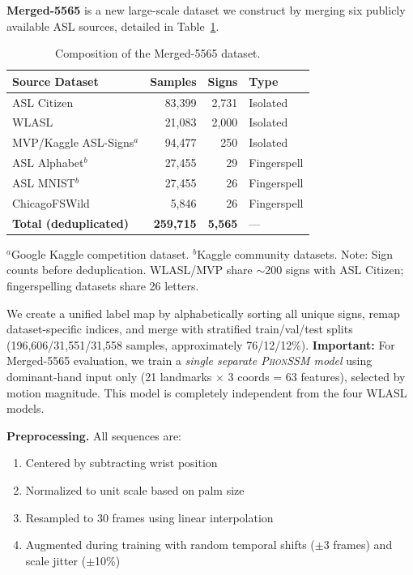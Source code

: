 \documentclass{article}
\newcommand{\phonssm}{\textsc{PhonSSM}}
\begin{document}
\textbf{Merged-5565} is a new large-scale dataset we construct by merging six publicly available ASL sources, detailed in Table~\ref{tab:merged_sources}.

\begin{table}[ht]
\caption{Composition of the Merged-5565 dataset.}
\label{tab:merged_sources}
\vspace{-1mm}
\begin{center}
\begin{small}
\begin{tabular}{lrrl}
\toprule
Source Dataset & Samples & Signs & Type \\
\midrule
ASL Citizen \citep{desai2023asl} & 83,399 & 2,731 & Isolated \\
WLASL \citep{li2020word} & 21,083 & 2,000 & Isolated \\
MVP/Kaggle ASL-Signs$^a$ & 94,477 & 250 & Isolated \\
\addlinespace
ASL Alphabet$^b$ & 27,455 & 29 & Fingerspell \\
ASL MNIST$^b$ & 27,455 & 26 & Fingerspell \\
ChicagoFSWild \citep{shi2019fingerspelling} & 5,846 & 26 & Fingerspell \\
\midrule
\textbf{Total (deduplicated)} & \textbf{259,715} & \textbf{5,565} & --- \\
\bottomrule
\end{tabular}
\end{small}
\end{center}
\vspace{1mm}
{\footnotesize $^a$Google Kaggle competition dataset. $^b$Kaggle community datasets. Note: Sign counts before deduplication. WLASL/MVP share ${\sim}$200 signs with ASL Citizen; fingerspelling datasets share 26 letters.}
\vspace{-2mm}
\end{table}

We create a unified label map by alphabetically sorting all unique signs, remap dataset-specific indices, and merge with stratified train/val/test splits (196,606/31,551/31,558 samples, approximately 76/12/12\%). \textbf{Important:} For Merged-5565 evaluation, we train a \textit{single separate \phonssm{} model} using dominant-hand input only (21 landmarks $\times$ 3 coords = 63 features), selected by motion magnitude. This model is completely independent from the four WLASL models.

\textbf{Preprocessing.} All sequences are:
\begin{enumerate}[nosep,topsep=3pt,leftmargin=*]
\item Centered by subtracting wrist position
\item Normalized to unit scale based on palm size
\item Resampled to 30 frames using linear interpolation
\item Augmented during training with random temporal shifts ($\pm$3 frames) and scale jitter ($\pm$10\%)
\end{enumerate}
\end{document}
